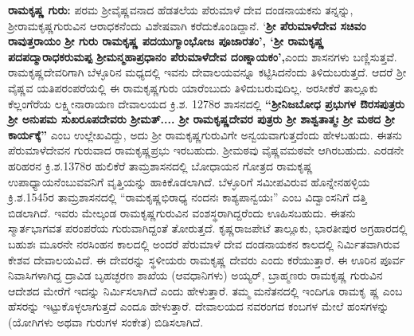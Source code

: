 \textbf{ರಾಮಕೃಷ್ಣ ಗುರು:} ಪರಮ ಶ‍್ರೀವೈಷ್ಣವನಾದ ಹೆಡತಲೆಯ ಪೆರುಮಾಳೆ ದೇವ ದಂಡನಾಯಕನು ತನ್ನನ್ನು, ಶ‍್ರೀರಾಮಕೃಷ್ಣಗುರುವಿನ ಆರಾಧಕನೆಂದು ವಿಶೇಷವಾಗಿ ಕರೆದುಕೊಂಡಿದ್ದಾನೆ. ‘\textbf{ಶ‍್ರೀ ಪೆರುಮಾಳೆದೇವ ಸಚಿವಂ ರಾವುತ್ತರಾಯಂ ಶ‍್ರೀ ಗುರು ರಾಮಕೃಷ್ಣ ಪದಯುಗ್ಮಾಂಭೋಜ ಪೂಜಾರತಂ’, ‘ಶ‍್ರೀ ರಾಮಕೃಷ್ಣ ಪದಪದ್ಮಾರಾಧಕರುಮಪ್ಪ\general{\break } ಶ‍್ರೀಮನ್ಮಹಾಪ್ರಧಾನಂ ಪೆರುಮಾಳೆದೇವ ದಂಣ್ನಾಯಕಂ’,}ಎಂದು ಶಾಸನಗಳು ಬಣ್ಣಿಸುತ್ತವೆ. ರಾಮಕೃಷ್ಣದೇವರಿಗಾಗಿ ಬೆಳ್ಳೂರಿನ ಮಧ್ಯದಲ್ಲಿ ಇವನು ದೇವಾಲಯವನ್ನೂ ಕಟ್ಟಿಸಿದನೆಂದು ತಿಳಿದುಬರುತ್ತದೆ. ಆದರೆ ಶ‍್ರೀ ವೈಷ್ಣವ ಯತಿಪರಂಪರೆಯಲ್ಲಿ ಈ ರಾಮಕೃಷ್ಣಗುರು ಯಾರೆಂಬುದು ತಿಳಿದುಬರುವುದಿಲ್ಲ. ಅರಸೀಕೆರೆ ತಾಲ್ಲೂಕು ಕೆಲ್ಲಂಗೆರೆಯ ಲಕ್ಷ್ಮೀನಾರಾಯಣ ದೇವಾಲಯದ ಕ್ರಿ.ಶ. 1278ರ ಶಾಸನದಲ್ಲಿ \textbf{“ಶ‍್ರೀನಿಜಬೋಧ ಪ್ರಭುಗಳ ಔರಸಪುತ್ರರು ಶ‍್ರೀ ಅನುಪಮ ಸುಖರೂಪದೇವರು ಶ‍್ರೀಮತ್​.... ಶ‍್ರೀ ರಾಮಕೃಷ್ಣದೇವರ ಪುತ್ರರು ಶ‍್ರೀ ಶಾಶ್ವತಾತ್ಮಃ ಶ‍್ರೀ ಮಠದ ಶ‍್ರೀ ಕಾರ್ಯಕ್ಕೆ”} ಎಂಬ ಉಲ್ಲೇಖವಿದ್ದು, ಅದು ಶ‍್ರೀ ರಾಮಕೃಷ್ಣಗುರುವಿಗೇ ಅನ್ವಯವಾಗುತ್ತದೆಂದು ಹೇಳಬಹುದು. ಈತನು ಪೆರುಮಾಳೆದೇವನ ಗುರುವಾದ ರಾಮಕೃಷ್ಣಪ್ರಭು ಇರಬಹುದು. ಶ‍್ರೀಮಠವು ವೈಷ್ಣವಮಠವೇ ಆಗಿರಬಹುದು. ಎರಡನೇ ಹರಿಹರನ ಕ್ರಿ.ಶ.1378ರ ಹುಲಿಕೆರೆ ತಾಮ್ರಶಾಸನದಲ್ಲಿ ಬೋಧಾಯನ ಗೋತ್ರದ ರಾಮಕೃಷ್ಣ ಉಪಾಧ್ಯಾಯನೆಂಬುವವನಿಗೆ ವೃತ್ತಿಯನ್ನು ಹಾಕಿಕೊಡಲಾಗಿದೆ. ಬೆಳ್ಳೂರಿಗೆ ಸಮೀಪವಿರುವ ಹೊನ್ನೇನಹಳ್ಳಿಯ ಕ್ರಿ.ಶ.1545ರ ತಾಮ್ರಶಾಸನದಲ್ಲಿ “ರಾಮಕೃಷ್ಣಭಿರಾಧ್ಯ ನಂದನಃ ಕಾಶ್ಯಪಾನ್ವಯಃ” ಎಂಬ ವಿದ್ವಾಂಸನಿಗೆ ದತ್ತಿ ಬಿಡಲಾಗಿದೆ. ಇವರು ಮೇಲ್ಕಂಡ ರಾಮಕೃಷ್ಣಗುರುವಿನ ವಂಶಸ್ಥರಾಗಿದ್ದ\-ರೆಂದು ಊಹಿಸಬಹುದು. ಈತನು ಸ್ಮಾರ್ತಭಾಗವತ ಪರಂಪರೆಯ ಗುರುವಾಗಿದ್ದಂತೆ ತೋರುತ್ತದೆ. ಕೃಷ್ಣರಾಜಪೇಟೆ ತಾಲ್ಲೂಕು, ಭಾರತೀಪುರ ಅಗ್ರಹಾರದಲ್ಲಿ ಬಹುಶಃ ಮೂರನೇ ನರಸಿಂಹನ ಕಾಲದಲ್ಲಿ ಅಂದರೆ ಪೆರುಮಾಳೆ ದೇವ ದಂಡನಾಯಕನ ಕಾಲದಲ್ಲಿ ನಿರ್ಮಿತವಾಗಿರುವ ಕೇಶವ ದೇವಾಲಯವಿದೆ. ಈ ದೇವರನ್ನು ಸ್ಥಳೀಯರು ರಾಮಕೃಷ್ಣ ದೇವರು ಎಂದು ಕರೆಯುತ್ತಾರೆ. ಈ ಊರಿನ ಪೂರ್ವ ನಿವಾಸಿಗಳಾಗಿದ್ದ ದ್ರಾವಿಡ ಬೃಹಚ್ಛರಣ ಶಾಖೆಯ (ಆವಧಾನಿಗಳು) ಅಯ್ಯರ್, ಬ್ರಾಹ್ಮಣರು ರಾಮಕೃಷ್ಣ ಗುರುವಿನ ಆದೇಶದ ಮೇರೆಗೆ ಇದನ್ನು ನಿರ್ಮಿಸಲಾಗಿದೆ ಎಂದು ಹೇಳುತ್ತಾರೆ. ತಮ್ಮ ಮನೆತನದಲ್ಲಿ ಇಂದಿಗೂ ರಾಮಕೃ ಷ್ಣ ಎಂಬ ಹೆಸರನ್ನು ಇಟ್ಟುಕೊಳ್ಳಲಾಗುತ್ತದೆ ಎಂದೂ ಹೇಳುತ್ತಾರೆ. ದೇವಾಲಯದ ನವರಂಗದ ಕಂಬಗಳ ಮೇಲೆ ಹಂಸಗಳನ್ನು (ಯೋಗಿಗಳು ಅಥವಾ ಗುರುಗಳ ಸಂಕೇತ) ಬಿಡಿಸಲಾಗಿದೆ.

\newpage

